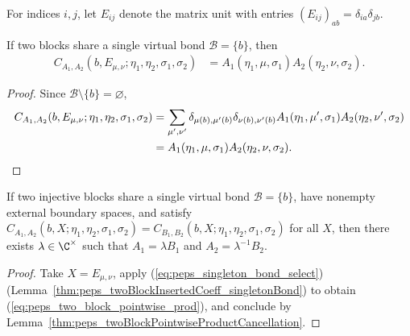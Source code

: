 \begin{definition}%
    \label{def:peps_matrixUnit}
    \mathlibok %
    For indices $i,j$, let $E_{ij}$ denote the matrix unit with entries
    $(E_{ij})_{ab}=\delta_{ia}\delta_{jb}$.
\end{definition}

\begin{lemma}%
    \label{thm:peps_twoBlockInsertedCoeff_singletonBond}
    \leanok
    If two blocks share a single virtual bond $\mathcal B=\{b\}$, then
    \begin{align}
        C_{A_1,A_2}
        (b,E_{\mu,\nu};\eta_1,\eta_2,\sigma_1,\sigma_2)
         & =
        A_1(\eta_1,\mu,\sigma_1)A_2(\eta_2,\nu,\sigma_2).
        \label{eq:peps_singleton_bond_select}
    \end{align}
\end{lemma}
\begin{proof}\leanok
    Since $\mathcal B\setminus\{b\}=\varnothing$,
    \begin{align}
        C_{A_1,A_2}(b,E_{\mu,\nu};\eta_1,\eta_2,\sigma_1,\sigma_2)
         & =
        \sum_{\mu',\nu'}
        \delta_{\mu(b),\mu'(b)}\delta_{\nu(b),\nu'(b)}
        A_1(\eta_1,\mu',\sigma_1)A_2(\eta_2,\nu',\sigma_2)
        \notag \\
         & =
        A_1(\eta_1,\mu,\sigma_1)A_2(\eta_2,\nu,\sigma_2).
        \notag
    \end{align}
\end{proof}

\begin{lemma}%
    \label{thm:peps_twoInjectiveTensorInsertionComparison_singletonBond}
    \leanok
    If two injective blocks share a single virtual bond $\mathcal B=\{b\}$, have
    nonempty external boundary spaces, and satisfy
    $C_{A_1,A_2}(b,X;\eta_1,\eta_2,\sigma_1,\sigma_2)
        =C_{B_1,B_2}(b,X;\eta_1,\eta_2,\sigma_1,\sigma_2)$ for all $X$, then there
    exists $\lambda\in\C^\times$ such that $A_1=\lambda B_1$ and
    $A_2=\lambda^{-1}B_2$.
\end{lemma}
\begin{proof}\leanok
    Take $X=E_{\mu,\nu}$, apply (\ref{eq:peps_singleton_bond_select})
    (Lemma~\ref{thm:peps_twoBlockInsertedCoeff_singletonBond}) to obtain
    (\ref{eq:peps_two_block_pointwise_prod}), and conclude by
    Lemma~\ref{thm:peps_twoBlockPointwiseProductCancellation}.
\end{proof}

